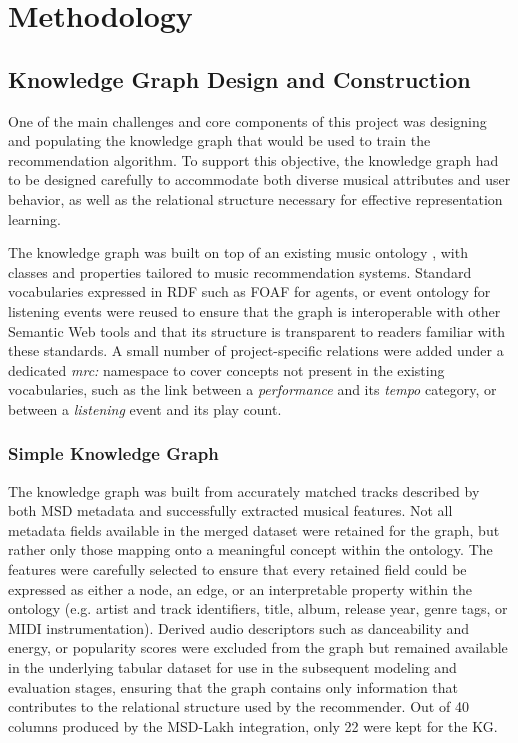 \section{Methodology}

\subsection{Knowledge Graph Design and Construction}

One of the main challenges and core components of this project was designing and populating the knowledge graph that would be used to train the recommendation algorithm. To support this objective, the knowledge graph had to be designed carefully to accommodate both diverse musical attributes and user behavior, as well as the relational structure necessary for effective representation learning.

The knowledge graph was built on top of an existing music ontology \cite{raimond2007musicontology}, with classes and properties tailored to music recommendation systems. Standard vocabularies expressed in RDF such as FOAF for agents, or event ontology for listening events were reused to ensure that the graph is interoperable with other Semantic Web tools and that its structure is transparent to readers familiar with these standards. A small number of project-specific relations were added under a dedicated \textit{mrc:} namespace to cover concepts not present in the existing vocabularies, such as the link between a \textit{performance} and its \textit{tempo} category, or between a \textit{listening} event and its play count.

\subsubsection{Simple Knowledge Graph}

The knowledge graph was built from accurately matched tracks described by both MSD metadata and successfully extracted musical features. Not all metadata fields available in the merged dataset were retained for the graph, but rather only those mapping onto a meaningful concept within the ontology. The features were carefully selected to ensure that every retained field could be expressed as either a node, an edge, or an interpretable property within the ontology (e.g. artist and track identifiers, title, album, release year, genre tags, or MIDI instrumentation). Derived audio descriptors such as danceability and energy, or popularity scores were excluded from the graph but remained available in the underlying tabular dataset for use in the subsequent modeling and evaluation stages, ensuring that the graph contains only information that contributes to the relational structure used by the recommender. Out of 40 columns produced by the MSD-Lakh integration, only 22 were kept for the KG. 

